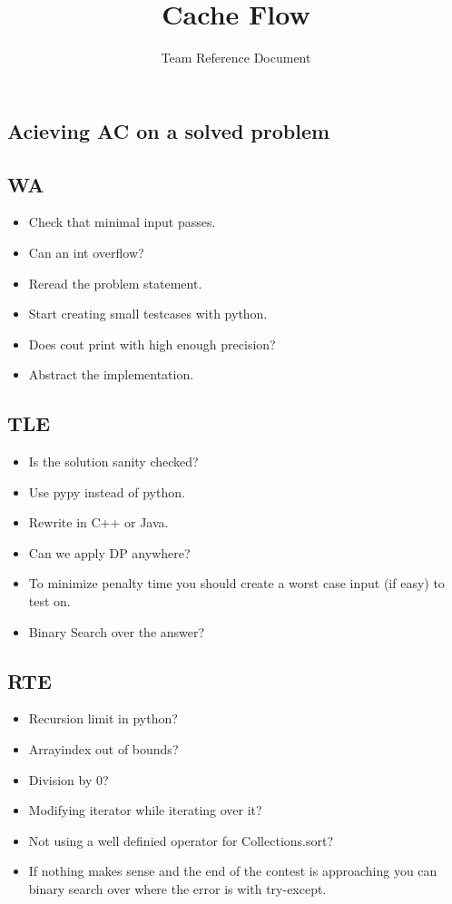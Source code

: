 \documentclass[8pt,a4paper,landscape,oneside]{amsart}
\title{Cache Flow}
\subtitle{Team Reference Document}
\date{\ddmmyyyydate{\today{}}}
\begin{document}
\begin{multicols*}{2}
\maketitle
\thispagestyle{fancy}
\vspace{-3em}

\tableofcontents
\begin{large}
\section{Acieving AC on a solved problem}
    \subsection{WA}
        \begin{itemize}
        \item Check that minimal input passes.
        \item Can an int overflow?
        \item Reread the problem statement.
        \item Start creating small testcases with python.
        \item Does cout print with high enough precision?
        \item Abstract the implementation.
        \end{itemize}
    \subsection{TLE}
        \begin{itemize}
        \item Is the solution sanity checked?
        \item Use pypy instead of python.
        \item Rewrite in C++ or Java.
        \item Can we apply DP anywhere?
        \item To minimize penalty time you should create a worst case input (if easy) to test on.
        \item Binary Search over the answer?
        \end{itemize}
    \subsection{RTE}
        \begin{itemize}
        \item Recursion limit in python?
        \item Arrayindex out of bounds?
        \item Division by $0$?
        \item Modifying iterator while iterating over it?
        \item Not using a well definied operator for Collections.sort?
        \item If nothing makes sense and the end of the contest is approaching you 
            can binary search over where the error is with try-except.
        \end{itemize}

\end{large}
\end{multicols*}
\end{document}
